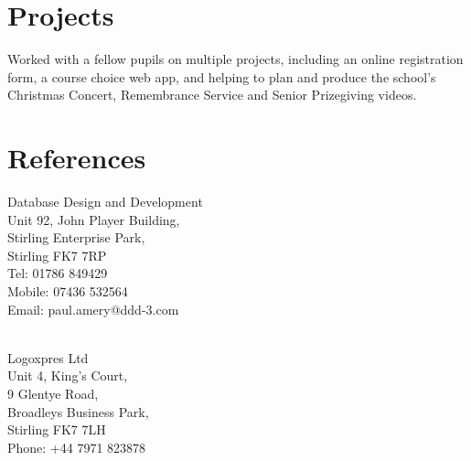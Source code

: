 \documentclass[]{hieudo-build}
\begin{document}
\begin{minipage}[t]{0.62\textwidth}
\section{Projects}

\begin{tightemize}
    \item Worked with a fellow pupils on multiple projects, including an online registration form, a course choice web app, and helping to plan and produce the school’s Christmas Concert, Remembrance Service and Senior Prizegiving videos.
\end{tightemize}
\sectionsep

\end{minipage} 

\newpage

\section{References}

\begin{minipage}[t]{0.36\textwidth} 

Database Design and Development \\
\minisectionsep
Unit 92, John Player Building, \\
Stirling Enterprise Park, \\
Stirling FK7 7RP \\
\minisectionsep
Tel: 01786 849429 \\
Mobile: 07436 532564 \\
Email: paul.amery@ddd-3.com \\

\end{minipage}
\hfill
\begin{minipage}[t]{0.62\textwidth}

 \\
Logoxpres Ltd \\
\minisectionsep
Unit 4, King's Court, \\
9 Glentye Road, \\
Broadleys Business Park, \\
Stirling FK7 7LH \\
\minisectionsep
Phone: +44 7971 823878 \\
\end{minipage}
\end{document}
